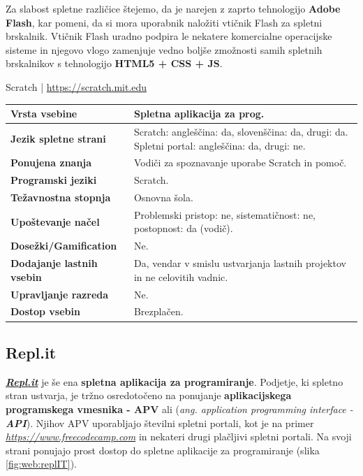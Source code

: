 Za slabost spletne različice štejemo, da je narejen z zaprto
tehnologijo \textbf{Adobe Flash}, kar pomeni, da si mora uporabnik 
naložiti vtičnik Flash za spletni brskalnik. Vtičnik Flash uradno
podpira le nekatere komercialne operacijske sisteme in njegovo vlogo
zamenjuje vedno boljše zmožnosti samih spletnih brskalnikov s
tehnologijo \textbf{HTML5 + CSS + JS}.

\begin{osebnabox}[label={osebna:scratch}]{Scratch | \url{https://scratch.mit.edu}}
    \begin{tabular}{
  p{} |
  p{}  }
  \textbf{Vrsta vsebine} & Spletna aplikacija za prog. \\
      \hline
  \textbf{Jezik spletne strani} & Scratch: angleščina: da, slovenščina: da,
                                  drugi: da. Spletni portal:
                                  angleščina: da, drugi: ne.\\
      \hline
  \textbf{Ponujena znanja} & Vodiči za spoznavanje uporabe Scratch in pomoč. \\
      \hline
 \textbf{Programski jeziki} & Scratch. \\
      \hline
  \textbf{Težavnostna stopnja} & Osnovna šola. \\
      \hline
   \textbf{Upoštevanje načel} & Problemski pristop: ne,
                                sistematičnost: ne, postopnost: da (vodič). \\
      \hline
  \textbf{Dosežki/Gamification} & Ne. \\
      \hline
  \textbf{Dodajanje lastnih vsebin} & Da, vendar v smislu ustvarjanja
                                      lastnih projektov in ne
                                      celovitih vadnic. \\
      \hline
  \textbf{Upravljanje razreda} & Ne. \\
      \hline
  \textbf{Dostop vsebin} & Brezplačen. \\
\end{tabular}
\end{osebnabox}

\subsection{Repl.it}
\label{sec:repl.it}

\textbf{\emph{\href{https://repl.it/}{Repl.it}}} \cite{web:replIT} je še ena
\textbf{spletna aplikacija za programiranje}. Podjetje, ki spletno
stran ustvarja, je tržno osredotočeno na ponujanje \textbf{aplikacijskega
  programskega vmesnika - APV} ali (\emph{ang. application programming
  interface - \textbf{API}}). Njihov APV uporabljajo številni spletni
portali, kot je na primer
\emph{\href{freecodecamp}{https://www.freecodecamp.com}}
\cite{web:freecodecamp} in nekateri drugi plačljivi spletni
portali. Na svoji strani ponujajo prost dostop do spletne aplikacije
za programiranje (slika \ref{fig:web:replIT}).

